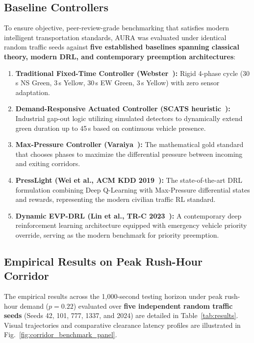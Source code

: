 \subsection{Baseline Controllers}
To ensure objective, peer-review-grade benchmarking that satisfies modern intelligent transportation standards, AURA was evaluated under identical random traffic seeds against \textbf{five established baselines spanning classical theory, modern DRL, and contemporary preemption architectures}:
\begin{enumerate}
    \item \textbf{Traditional Fixed-Time Controller (Webster~\cite{webster1958}):} Rigid 4-phase cycle (30\,s NS Green, 3\,s Yellow, 30\,s EW Green, 3\,s Yellow) with zero sensor adaptation.
    \item \textbf{Demand-Responsive Actuated Controller (SCATS heuristic~\cite{lowrie1990scats}):} Industrial gap-out logic utilizing simulated detectors to dynamically extend green duration up to 45\,s based on continuous vehicle presence.
    \item \textbf{Max-Pressure Controller (Varaiya~\cite{varaiya2013maxpressure}):} The mathematical gold standard that chooses phases to maximize the differential pressure between incoming and exiting corridors.
    \item \textbf{PressLight (Wei et al., ACM KDD 2019~\cite{wei2019presslight}):} The state-of-the-art DRL formulation combining Deep Q-Learning with Max-Pressure differential states and rewards, representing the modern civilian traffic RL standard.
    \item \textbf{Dynamic EVP-DRL (Lin et al., TR-C 2023~\cite{lin2023dynamic}):} A contemporary deep reinforcement learning architecture equipped with emergency vehicle priority override, serving as the modern benchmark for priority preemption.
\end{enumerate}

\subsection{Empirical Results on Peak Rush-Hour Corridor}
The empirical results across the 1,000-second testing horizon under peak rush-hour demand ($p = 0.22$) evaluated over \textbf{five independent random traffic seeds} (Seeds 42, 101, 777, 1337, and 2024) are detailed in Table~\ref{tab:results}. Visual trajectories and comparative clearance latency profiles are illustrated in Fig.~\ref{fig:corridor_benchmark_panel}.

